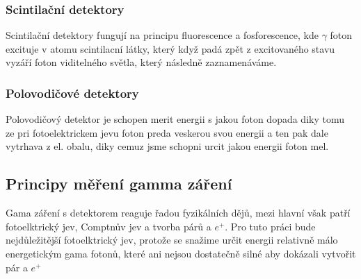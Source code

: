 \subsubsection{Scintilační detektory}
Scintilační detektory fungují na principu fluorescence a fosforescence, kde $\gamma$ foton excituje \e v atomu scintilacní látky, který když padá zpět z excitovaného stavu vyzáří foton viditelného světla, který následně zaznamenáváme.\cite{Knoll2010, Scintilators}
\subsubsection{Polovodičové detektory}
Polovodičový detektor je schopen merit energii s jakou foton dopada diky tomu ze pri fotoelektrickem jevu foton preda veskerou svou energii \e a ten pak dale vytrhava \e z el. obalu, diky cemuz jsme schopni urcit jakou energii foton mel. %

\subsection{Principy měření gamma záření}%
Gama záření s detektorem reaguje řadou fyzikálních dějů, mezi hlavní však patří fotoelktrický jev, Comptnův jev a tvorba párů \e a $e^+$. Pro tuto práci bude nejdůležitější fotoelktrický jev, protože se snažime určit energii relativně málo energetickým gama fotonů, které ani nejsou dostatečně silné aby dokázali vytvořit pár \e a $e^+$ \cite{DusanBc}
